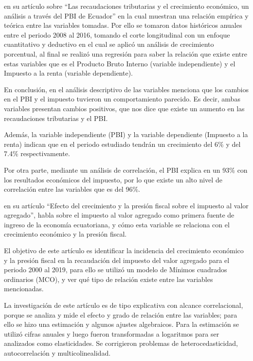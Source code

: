 \documentclass[
  letterpaper,
]{article}
\begin{document}
\textcite{ronquillo_recaudaciones_2017} en su artículo sobre ``Las
recaudaciones tributarias y el crecimiento económico, un análisis a
través del PBI de Ecuador'' en la cual muestran una relación empírica y
teórica entre las variables tomadas. Por ello se tomaron datos
históricos anuales entre el periodo 2008 al 2016, tomando el corte
longitudinal con un enfoque cuantitativo y deductivo en el cual se
aplicó un análisis de crecimiento porcentual, al final se realizó una
regresión para saber la relación que existe entre estas variables que es
el Producto Bruto Interno (variable independiente) y el Impuesto a la
renta (variable dependiente).

En conclusión, en el análisis descriptivo de las variables menciona que
los cambios en el PBI y el impuesto tuvieron un comportamiento parecido.
Es decir, ambas variables presentan cambios positivos, que nos dice que
existe un aumento en las recaudaciones tributarias y el PBI.

Además, la variable independiente (PBI) y la variable dependiente
(Impuesto a la renta) indican que en el periodo estudiado tendrán un
crecimiento del 6\% y del 7.4\% respectivamente.

Por otra parte, mediante un análisis de correlación, el PBI explica en
un 93\% con los resultados económicos del impuesto, por lo que existe un
alto nivel de correlación entre las variables que es del 96\%.

\textcite{cacay_cacay_efecto_2021} en su artículo ``Efecto del
crecimiento y la presión fiscal sobre el impuesto al valor agregado'',
habla sobre el impuesto al valor agregado como primera fuente de ingreso
de la economía ecuatoriana, y cómo esta variable se relaciona con el
crecimiento económico y la presión fiscal.

El objetivo de este artículo es identificar la incidencia del
crecimiento económico y la presión fiscal en la recaudación del impuesto
del valor agregado para el periodo 2000 al 2019, para ello se utilizó un
modelo de Mínimos cuadrados ordinarios (MCO), y ver qué tipo de relación
existe entre las variables mencionadas.

La investigación de este artículo es de tipo explicativa con alcance
correlacional, porque se analiza y mide el efecto y grado de relación
entre las variables; para ello se hizo una estimación y algunos ajustes
algebraicos. Para la estimación se utilizó cifras anuales y luego fueron
transformadas a logaritmos para ser analizados como elasticidades. Se
corrigieron problemas de heterocedasticidad, autocorrelación y
multicolinealidad.
\end{document}

